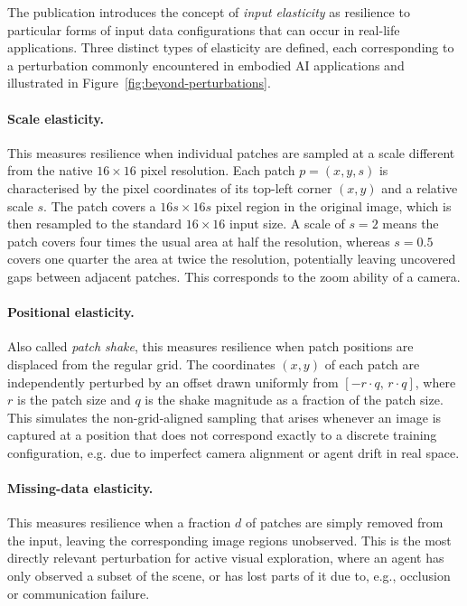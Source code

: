 The publication introduces the concept of \emph{input elasticity} as resilience to particular
forms of input data configurations that can occur in real-life applications. Three distinct types of elasticity are defined, each corresponding to a perturbation commonly encountered in embodied AI applications and illustrated in Figure~\ref{fig:beyond-perturbations}.

\paragraph{Scale elasticity.} This measures resilience when individual patches are sampled at a scale different from the native $16\times16$ pixel resolution. Each patch $p = (x, y, s)$ is characterised by the pixel coordinates of its top-left corner $(x, y)$ and a relative scale $s$. The patch covers a $16s \times 16s$ pixel region in the original image, which is then resampled to the standard $16\times16$ input size. A scale of $s = 2$ means the patch covers four times the usual area at half the resolution, whereas $s = 0.5$ covers one quarter the area at twice the resolution, potentially leaving uncovered gaps between adjacent patches. This corresponds to the zoom ability of a camera.

\paragraph{Positional elasticity.} Also called \emph{patch shake}, this measures resilience when patch positions are displaced from the regular grid. The coordinates $(x, y)$ of each patch are independently perturbed by an offset drawn uniformly from $[-r \cdot q,\, r \cdot q]$, where $r$ is the patch size and $q$ is the shake magnitude as a fraction of the patch size. This simulates the non-grid-aligned sampling that arises whenever an image is captured at a position that does not correspond exactly to a discrete training configuration, e.g. due to imperfect camera alignment or agent drift in real space.

\paragraph{Missing-data elasticity.} This measures resilience when a fraction $d$ of patches are simply removed from the input, leaving the corresponding image regions unobserved. This is the most directly relevant perturbation for active visual exploration, where an agent has only observed a subset of the scene, or has lost parts of it due to, e.g., occlusion or communication failure.

